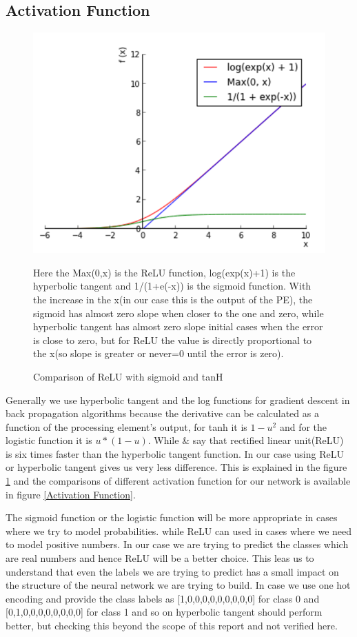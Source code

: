 \documentclass[conference]{IEEEtran}
\begin{document}
\subsection{Activation Function}
\begin{figure}[h!]
\centering
\includegraphics[scale=0.5]{relucomparison}
\caption{Comparison of ReLU with sigmoid and tanH}
\label{relu comparison}
\footnotesize{Here the Max(0,x) is the ReLU function, log(exp(x)+1) is the hyperbolic tangent and 1/(1+e(-x)) is the sigmoid function. With the increase in the x(in our case this is the output of the PE), the sigmoid has almost zero slope when closer to the one and zero, while hyperbolic tangent has almost zero slope initial cases when the error is close to zero, but for ReLU the value is directly proportional to the x(so slope is greater or never=0 until the error is zero).}
\end{figure}
Generally we use hyperbolic tangent and the log functions for gradient descent in back propagation algorithms because the derivative can be calculated as a function of the processing element's output, for tanh it is $1 - u^2$ and for the logistic function it is $u * (1 - u)$. While \cite{relu} \& \cite{relu why faster} say that rectified linear unit(ReLU) is six times faster than the hyperbolic tangent function. In our case using ReLU or hyperbolic tangent gives us very less difference. This is explained in the figure \ref{relu comparison} and the comparisons of different activation function for our network is available in figure \ref{Activation Function}.

The sigmoid function or the logistic function will be more appropriate in cases where we try to model probabilities. while ReLU can used in cases where we need to model positive numbers. In our case we are trying to predict the classes which are real numbers and hence ReLU will be a better choice. This leas us to understand that even the labels we are trying to predict has a small impact on the structure of the neural network we are trying to build. In case we use one hot encoding and provide the class labels as [1,0,0,0,0,0,0,0,0,0] for class 0 and [0,1,0,0,0,0,0,0,0,0] for class 1 and so on hyperbolic tangent should perform better, but checking this beyond the scope of this report and not verified here.
\end{document}
